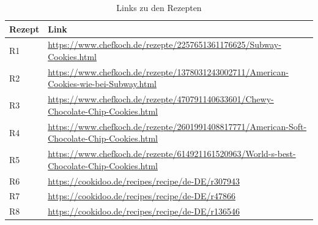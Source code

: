 \begin{table}[H]
\centering
\caption{Links zu den Rezepten}
\label{table:rezepte_links}
\small
\begin{tabular}{|l|>{\RaggedRight\arraybackslash}p{}|}
\hline
Rezept & Link \\
\hline
R1     & \url{https://www.chefkoch.de/rezepte/2257651361176625/Subway-Cookies.html} \\
R2     & \url{https://www.chefkoch.de/rezepte/1378031243002711/American-Cookies-wie-bei-Subway.html} \\
R3     & \url{https://www.chefkoch.de/rezepte/470791140633601/Chewy-Chocolate-Chip-Cookies.html} \\
R4     & \url{https://www.chefkoch.de/rezepte/2601991408817771/American-Soft-Chocolate-Chip-Cookies.html} \\
R5     & \url{https://www.chefkoch.de/rezepte/614921161520963/World-s-best-Chocolate-Chip-Cookies.html} \\
R6     & \url{https://cookidoo.de/recipes/recipe/de-DE/r307943} \\
R7     & \url{https://cookidoo.de/recipes/recipe/de-DE/r47866} \\
R8     & \url{https://cookidoo.de/recipes/recipe/de-DE/r136546} \\
\hline
\end{tabular}
\end{table}

